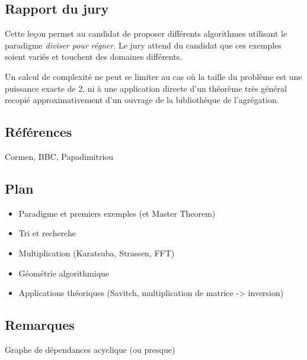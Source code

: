 \documentclass[../../Agregation.tex]{subfiles}
\begin{document}

\subsection{Rapport du jury}

\begin{aquote}{}
Cette leçon permet au candidat de proposer différents algorithmes utilisant le paradigme \emph{diviser pour régner}. Le jury attend du candidat que ces exemples soient variés et touchent des domaines différents.

Un calcul de complexité ne peut se limiter au cas où la taille du problème est une puissance exacte de 2, ni à une application directe d'un théorème très général recopié approximativement d'un ouvrage de la bibliothèque de l'agrégation.
\end{aquote}

\dvts

\subsection{Références}

Cormen, BBC, Papadimitriou

\subsection{Plan}

\begin{itemize}
	\item Paradigme et premiers exemples (et Master Theorem)
	\item Tri et recherche
	\item Multiplication (Karatsuba, Strassen, FFT)
	\item Géométrie algorithmique
	\item Applications théoriques (Savitch, multiplication de matrice -> inversion)
\end{itemize}

\subsection{Remarques}

Graphe de dépendances acyclique (ou presque)
\end{document}
